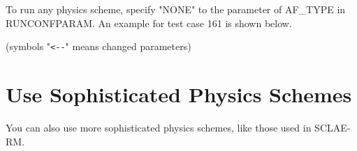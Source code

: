 
 \noindent To run any physics scheme, specify "NONE" to the parameter
 of AF\_TYPE in RUNCONFPARAM.
 An example for test case 161 is shown below.

 (symbols "\verb|<--|" means changed parameters)


\section{Use Sophisticated Physics Schemes}

 \noindent You can also use more sophisticated physics schemes, like those
 used in SCLAE-RM.  \\

